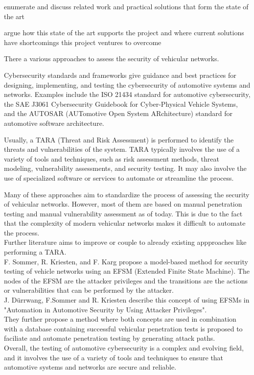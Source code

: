 \begin{shaded}
\noindent
enumerate and discuss related work and practical solutions that form the state of the art

\medskip

\noindent
argue how this state of the art supports the project and where current solutions have shortcomings this project ventures to overcome
\end{shaded}

There a various approaches to assess the security of vehicular networks.

Cybersecurity standards and frameworks give guidance and best practices for designing, implementing, 
and testing the cybersecurity of automotive systems and networks. 
Examples include the ISO 21434 standard for automotive cybersecurity\cite{iso21434},
the SAE J3061 Cybersecurity Guidebook for Cyber-Physical Vehicle Systems\cite{sae_j3061}, 
and the AUTOSAR (AUTomotive Open System ARchitecture) standard for automotive software architecture\cite{autosar}.

Usually, a TARA (Threat and Risk Assessment)\cite{tara} is performed to identify the threats and vulnerabilities of the system.
TARA typically involves the use of a variety of tools and techniques, such as risk assessment methods, 
threat modeling, vulnerability assessments, and security testing. 
It may also involve the use of specialized software or services to automate or streamline the process.

Many of these approaches aim to standardize the process of assessing the security of vehicular networks.
However, most of them are based on manual penetration testing and manual vulnerability assessment as of today.
This is due to the fact that the complexity of modern vehicular networks makes it difficult to automate the process.\\

Further literature aims to improve or couple to already existing appproaches like performing a TARA.\\
F. Sommer, R. Kriesten, and F. Karg propose a model-based method for security testing of vehicle networks\cite{model_based_testing}
using an EFSM (Extended Finite State Machine). 
The nodes of the EFSM are the attacker privileges and the transitions are the actions or vulnerabilities that can be performed by the attacker.\\
J. Dürrwang, F.Sommer and R. Kriesten describe this concept of using EFSMs in "Automation in Automotive Security by Using
Attacker Privileges"\cite{attacker_privileges}.\\
They further propose a method where both concepts are used in combination with a database 
containing successful vehicular penetration tests is proposed to faciliate and 
automate penetration testing by generating attack paths\cite{attack_database}.\\

Overall, the testing of automotive cybersecurity is a complex and evolving field, 
and it involves the use of a variety of tools and techniques to ensure that automotive systems and networks are secure and reliable.


